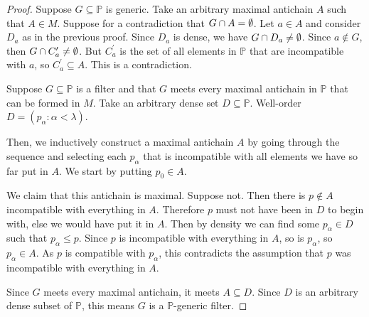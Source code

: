\documentclass[11pt]{article}
\renewcommand{\P}{\mathbb{P}}
\begin{document}
\begin{proof}
    Suppose $G \subseteq \P$ is generic.
    Take an arbitrary maximal antichain $A$ such that $A \in M$.
    Suppose for a contradiction that $G \cap A = \emptyset$.
    Let $a \in A$ and consider $D_a$ as in the previous proof.
    Since $D_a$ is dense, we have $G \cap D_a \neq \emptyset$.
    Since $a \notin G$, then $G \cap C^\prime_a \neq \emptyset$.
    But $C^\prime_a$ is the set of all elements in $\P$ that are incompatible
    with $a$, so $C^\prime_a \subseteq A$. This is a contradiction.

    Suppose $G \subseteq \P$ is a filter and that $G$ meets every maximal
    antichain in $\P$ that can be formed in $M$.
    Take an arbitrary dense set $D \subseteq \P$.
    Well-order
    $D = (p_\alpha : \alpha < \lambda)$.

    Then, we inductively construct a maximal antichain $A$ by going through the
    sequence and selecting each $p_\alpha$ that is incompatible with all
    elements we have so far put in $A$. We start by putting $p_0 \in A$.

    We claim that this antichain is maximal.
    Suppose not.
    Then there is $p \notin A$ incompatible with everything in $A$.
    Therefore $p$ must not have been in $D$ to begin with, else we would have
    put it in $A$.
    Then by density we can find some $p_\alpha \in D$ such that
    $p_\alpha \leq p$.
    Since $p$ is incompatible with everything in $A$, so is $p_\alpha$,
    so $p_\alpha \in A$.
    As $p$ is compatible with $p_\alpha$, this contradicts the assumption that
    $p$ was incompatible with everything in $A$.

    Since $G$ meets every maximal antichain, it meets $A \subseteq D$.
    Since $D$ is an arbitrary dense subset of $\P$, this means $G$ is a
    $\P$-generic filter.
\end{proof}
\end{document}
